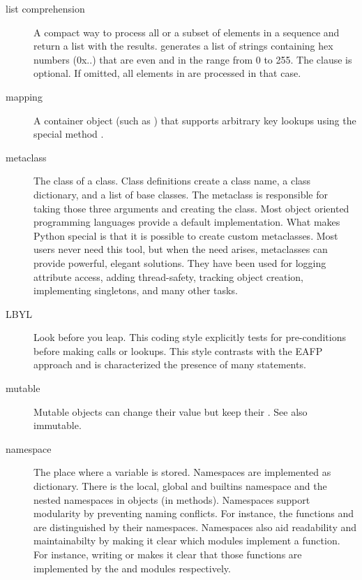 \begin{description}
\item[list comprehension]{A compact way to process all or a subset of elements
in a sequence and return a list with the results.   generates a list of strings
containing hex numbers (0x..) that are even and in the range from 0 to 255.
The  clause is optional.  If omitted, all elements in
{} are processed in that case.}

\item[mapping]{A container object (such as ) that supports
arbitrary key lookups using the special method .}

\item[metaclass]{The class of a class.  Class definitions create a class
name, a class dictionary, and a list of base classes.  The metaclass is
responsible for taking those three arguments and creating the class.  Most
object oriented programming languages provide a default implementation.
What makes Python special is that it is possible to create custom
metaclasses.  Most users never need this tool, but when the need arises,
metaclasses can provide powerful, elegant solutions.  They have been used
for logging attribute access, adding thread-safety, tracking object
creation, implementing singletons, and many other tasks.}

\item[LBYL]{Look before you leap.  This coding style explicitly tests for
pre-conditions before making calls or lookups.  This style contrasts with
the EAFP approach and is characterized the presence of many 
statements.}

\item[mutable]{Mutable objects can change their value but keep their
.  See also immutable.}

\item[namespace]{The place where a variable is stored.  Namespaces are
implemented as dictionary.  There is the local, global and builtins
namespace and the nested namespaces in objects (in methods).  Namespaces
support modularity by preventing naming conflicts.  For instance, the
functions  and  are
distinguished by their namespaces.  Namespaces also aid readability and
maintainabilty by making it clear which modules implement a function.  For
instance, writing  or 
makes it clear that those functions are implemented by the 
and  modules respectively.}


\end{description}
